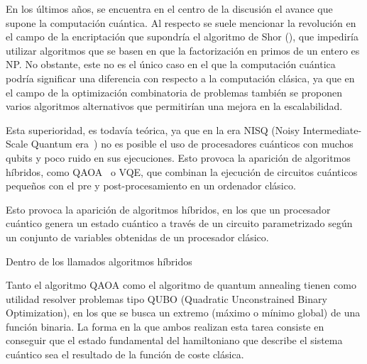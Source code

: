 En los últimos años, se encuentra en el centro de la discusión el avance que supone la computación cuántica. Al respecto se suele mencionar la revolución en el campo de la encriptación que supondría el algoritmo de Shor (\cite{Shor_algorithm}), que impediría utilizar algoritmos que se basen en que la factorización en primos de un entero es NP\@. No obstante, este no es el único caso en el que la computación cuántica podría significar una diferencia con respecto a la computación clásica, ya que en el campo de la optimización combinatoria  %
de problemas también se proponen varios algoritmos alternativos que permitirían una mejora en la escalabilidad.

Esta superioridad, es todavía teórica, ya que en la era NISQ (Noisy Intermediate-Scale Quantum era~\cite{Quantum_computing_in_the_NISQ_era_and_beyond}) no es posible el uso de procesadores cuánticos con muchos qubits y poco ruido  %
en sus ejecuciones. Esto provoca la aparición de algoritmos híbridos, como QAOA~\cite{qaoa_paper_original} o VQE, que combinan la ejecución de circuitos cuánticos pequeños con el pre y post-procesamiento en un ordenador clásico.

Esto provoca la aparición de algoritmos híbridos, en los que un procesador cuántico genera un estado cuántico a través de un circuito parametrizado según un conjunto de variables obtenidas de un procesador clásico.

Dentro de los llamados algoritmos híbridos



Tanto el algoritmo QAOA como el algoritmo de quantum annealing tienen como utilidad resolver problemas tipo QUBO (Quadratic Unconstrained Binary Optimization), en los que se busca un extremo (máximo o mínimo global) de una función binaria. La forma en la que ambos realizan esta tarea consiste en conseguir que el estado fundamental  %
 del hamiltoniano que describe el sistema cuántico sea el resultado de la función de coste clásica.

